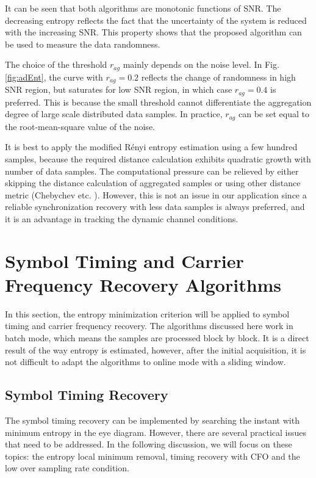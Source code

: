 \documentclass[journal,comsoc]{IEEEtran}
\begin{document}
It can be seen that both algorithms are monotonic functions of SNR.
The decreasing entropy reflects the fact that the uncertainty of the system is reduced with the increasing SNR.
This property shows that the proposed algorithm can be used to measure the data randomness.

The choice of the threshold \(r_{ag}\) mainly depends on the noise level.
In Fig. \ref{fig:adEnt}, the curve with \(r_{ag}=0.2\) reflects the change of randomness in high SNR region, but saturates for low SNR region, in which case \(r_{ag}=0.4\) is preferred.
This is because the small threshold cannot differentiate the aggregation degree of large scale distributed data samples.
In practice, $r_{ag}$ can be set equal to the root-mean-square value of the noise.

It is best to apply the modified R\'enyi entropy estimation using a few hundred samples,
because the required distance calculation exhibits quadratic growth with number of data samples. 
The computational pressure can be relieved by either skipping the distance calculation of aggregated samples or using other distance metric (Chebychev etc. \cite{Cha2007}).
However, this is not an issue in our application since a reliable synchronization  recovery with less data samples is always preferred, and it is an advantage in tracking the dynamic channel conditions. 
\section{Symbol Timing and Carrier Frequency Recovery Algorithms}
\label{sec:sync_algo}
In this section, the entropy minimization criterion will be applied to symbol timing and carrier frequency recovery.
The algorithms discussed here work in batch mode, which means the samples are processed block by block. 
It is a direct result of the way entropy is estimated, however, after the initial acquisition, it is not difficult to adapt the algorithms to online mode with a sliding window.





\subsection{Symbol Timing Recovery} 
\label{sec:timing}
The symbol timing recovery can be implemented by searching the instant with minimum entropy in the eye diagram.
However, there are several practical issues that need to be addressed.
In the following discussion, we will focus on these topics: the entropy local minimum removal, timing recovery with CFO and the low over sampling rate condition.
\end{document}
